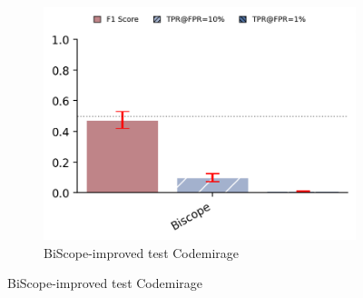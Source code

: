 \begin{figure}[H]
\begin{subfigure}[b]{0.5\textwidth}
        \includegraphics[width=\linewidth]{img/TEST/BiScope/eeb.png}
        \caption{BiScope-improved test Codemirage}
        \label{fig:ab1}
    \end{subfigure}
\end{figure}




